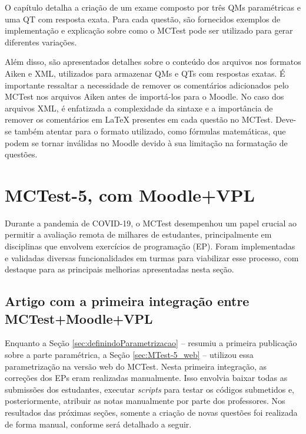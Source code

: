 O capítulo detalha a criação de um exame composto por três QMs paramétricas e uma QT com resposta exata. Para cada questão, são fornecidos exemplos de implementação e explicação sobre como o MCTest pode ser utilizado para gerar diferentes variações.

Além disso, são apresentados detalhes sobre o conteúdo dos arquivos nos formatos Aiken e XML, utilizados para armazenar QMs e QTs com respostas exatas. É importante ressaltar a necessidade de remover os comentários adicionados pelo MCTest nos arquivos Aiken antes de importá-los para o Moodle. No caso dos arquivos XML, é enfatizada a complexidade da sintaxe e a importância de remover os comentários em \LaTeX{} presentes em cada questão no MCTest. Deve-se também atentar para o formato utilizado, como fórmulas matemáticas, que podem se tornar inválidas no Moodle devido à sua limitação na formatação de questões.

\section{MCTest-5, com Moodle+VPL}\label{sec:mctest+moodle+vpl}

Durante a pandemia de COVID-19, o MCTest desempenhou um papel crucial ao permitir a avaliação remota de milhares de estudantes, principalmente em disciplinas que envolvem exercícios de programação (EP). Foram implementadas e validadas diversas funcionalidades em turmas para viabilizar esse processo, com destaque para as principais melhorias apresentadas nesta seção. %

\subsection{Artigo com a primeira integração entre MCTest+Moodle+VPL}\label{sec:MCTest-5web}

Enquanto a Seção \ref{sec:definindoParametrizacao} --  resumiu a primeira publicação sobre a parte paramétrica, a Seção \ref{sec:MTest-5_web} --  utilizou essa parametrização na versão web do MCTest. Nesta primeira integração, as correções dos EPs eram realizadas manualmente. Isso envolvia baixar todas as submissões dos estudantes, executar \textit{scripts} para testar os códigos submetidos e, posteriormente, atribuir as notas manualmente por parte dos professores. Nos resultados das próximas seções, somente a criação de novas questões foi realizada de forma manual, conforme será detalhado a seguir.

